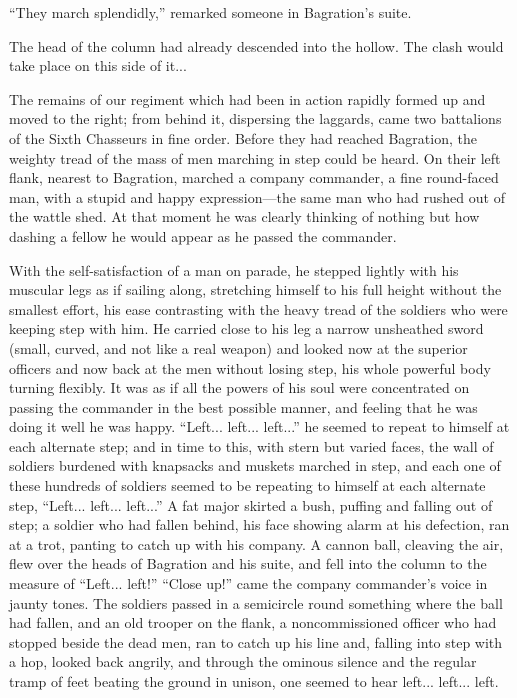 ``They march splendidly,'' remarked someone in Bagration's suite.

The head of the column had already descended into the hollow. The
clash would take place on this side of it...

The remains of our regiment which had been in action rapidly
formed up and moved to the right; from behind it, dispersing the
laggards, came two battalions of the Sixth Chasseurs in fine
order. Before they had reached Bagration, the weighty tread of
the mass of men marching in step could be heard. On their left
flank, nearest to Bagration, marched a company commander, a fine
round-faced man, with a stupid and happy expression---the same
man who had rushed out of the wattle shed. At that moment he was
clearly thinking of nothing but how dashing a fellow he would
appear as he passed the commander.

With the self-satisfaction of a man on parade, he stepped lightly
with his muscular legs as if sailing along, stretching himself to
his full height without the smallest effort, his ease contrasting
with the heavy tread of the soldiers who were keeping step with
him. He carried close to his leg a narrow unsheathed sword
(small, curved, and not like a real weapon) and looked now at the
superior officers and now back at the men without losing step,
his whole powerful body turning flexibly. It was as if all the
powers of his soul were concentrated on passing the commander in
the best possible manner, and feeling that he was doing it well
he was happy. ``Left... left... left...'' he seemed to repeat to
himself at each alternate step; and in time to this, with stern
but varied faces, the wall of soldiers burdened with knapsacks
and muskets marched in step, and each one of these hundreds of
soldiers seemed to be repeating to himself at each alternate
step, ``Left... left... left...'' A fat major skirted a bush,
puffing and falling out of step; a soldier who had fallen behind,
his face showing alarm at his defection, ran at a trot, panting
to catch up with his company. A cannon ball, cleaving the air,
flew over the heads of Bagration and his suite, and fell into the
column to the measure of ``Left... left!'' ``Close up!'' came the
company commander's voice in jaunty tones. The soldiers passed in
a semicircle round something where the ball had fallen, and an
old trooper on the flank, a noncommissioned officer who had
stopped beside the dead men, ran to catch up his line and,
falling into step with a hop, looked back angrily, and through
the ominous silence and the regular tramp of feet beating the
ground in unison, one seemed to hear left... left... left.

